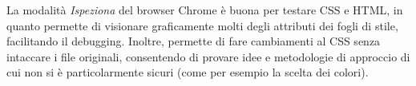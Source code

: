 La modalità \textit{Ispeziona} del browser Chrome è buona per testare CSS e HTML, in quanto permette di visionare graficamente molti degli attributi dei fogli di stile, facilitando il debugging. Inoltre, permette di fare cambiamenti al CSS senza intaccare i file originali, consentendo di provare idee e metodologie di approccio di cui non si è particolarmente sicuri (come per esempio la scelta dei colori).